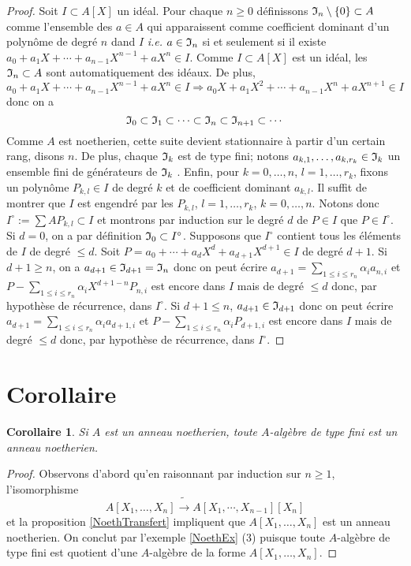 \documentclass[a4paper, oneside, 12pt]{book}
\theoremstyle{theoremeStyle} %
\newtheorem{corollaire}[theoreme]{Corollaire}
\theoremstyle{definition} %
\newcommand{\ie}{\textit{i.e.}} %
\begin{document}
\begin{proof}Soit $I\subset A[X]$ un idéal. Pour chaque $n\geq 0$ définissons $\frak{I}_n\setminus \lbrace 0\rbrace\subset A$ comme l'ensemble des $a\in A$ qui apparaissent comme coefficient dominant  d'un polynôme de degré $n$ dand $I$ \ie{} $a\in \frak{I}_n$ si et seulement si il existe $a_0+a_1X+\cdots+a_{n-1}X^{n-1}+aX^n\in I$. Comme $I\subset A[X]$ est un idéal, les $\frak{I}_n\subset A$ sont automatiquement des idéaux. De plus,  $$a_0+a_1X+\cdots+a_{n-1}X^{n-1}+aX^n\in I\Rightarrow a_0X+a_1X^2+\cdots+a_{n-1}X^{n}+aX^{n+1}\in I$$ donc on a 
$$\frak{I}_0\subset \frak{I}_1\subset \cdots\subset \frak{I}_n\subset \frak{I}_{n+1}\subset \cdots$$
Comme $A$ est noetherien, cette suite devient stationnaire à partir d'un certain rang, disons $n$. De plus,  chaque $\frak{I}_k$ est de type fini; notons $a_{k,1},\dots, a_{k,r_k}\in \frak{I}_k$ un ensemble fini de générateurs de $\frak{I}_k$ . Enfin,  pour  $k=0,\dots, n$, $l=1,\dots, r_k$, fixons un polynôme $P_{k,l}\in I$ de degré $k$ et de coefficient dominant $a_{k,l}$. Il suffit de montrer que $I$ est engendré par les $P_{k,l}$,  $l=1,\dots, r_k$, $k=0,\dots, n$. Notons donc $I^\circ:=\sum AP_{k,l}\subset I$ et montrons par induction sur le degré $d$ de $P\in I$ que $P\in I^\circ$. Si $d=0$, on a par définition $  \frak{I}_0\subset I^\circ$. Supposons que $I^\circ$ contient tous les   éléments de $I$ de degré $\leq d$. Soit $P=a_0+\cdots+a_dX^d+a_{d+1}X^{d+1}\in I$ de degré $d+1$. Si $d+1\geq n$, on a $a_{d+1}\in \frak{I}_{d+1}=\frak{I}_n$ donc on peut écrire $a_{d+1}=\sum_{1\leq i\leq r_n}\alpha_ia_{n,i}$ et $P-\sum_{1\leq i\leq r_n}\alpha_iX^{d+1-n}P_{n,i}$ est encore dans $I$ mais de degré $\leq d$ donc, par hypothèse de récurrence, dans $I^\circ$. Si $d+1\leq n$, $a_{d+1}\in \frak{I}_{d+1}$ donc on peut écrire $a_{d+1}=\sum_{1\leq i\leq r_n}\alpha_ia_{d+1,i}$ et $P-\sum_{1\leq i\leq r_n}\alpha_i P_{d+1,i}$ est encore dans $I$ mais de degré $\leq d$ donc, par hypothèse de récurrence, dans $I^\circ$.
\end{proof}

\section{Corollaire}
\begin{corollaire}\label{NoethTransfertCor}
  Si $A$ est un anneau noetherien, toute $A$-algèbre de type fini est un anneau noetherien.
\end{corollaire}

\begin{proof}
  Observons d'abord qu'en raisonnant par induction sur $n\geq 1$, l'isomorphisme $$A[X_1,\dots, X_n]\tilde{\rightarrow} A[X_1,\cdots,X_{n-1}] [X_n]$$ et la proposition \ref{NoethTransfert} impliquent que $A[X_1,\dots, X_n]$ est un anneau noetherien. On conclut par l'exemple \ref{NoethEx} (3) puisque toute $A$-algèbre de type fini  est quotient d'une $A$-algèbre de la forme $A[X_1,\dots, X_n]$.
\end{proof}
\end{document}
